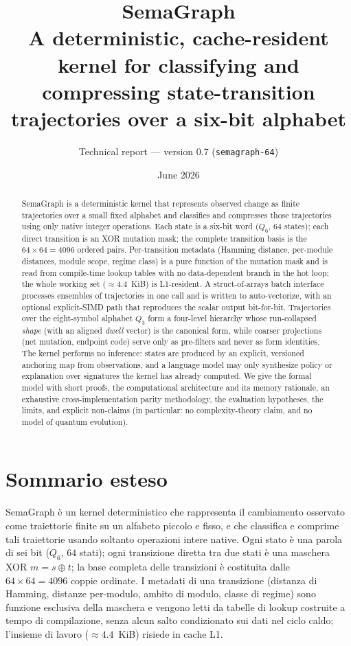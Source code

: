 \documentclass[11pt,a4paper]{article}
\title{SemaGraph\\[2pt]
\large A deterministic, cache-resident kernel for classifying and compressing
state-transition trajectories over a six-bit alphabet}
\author{Technical report --- version 0.7 (\texttt{semagraph-64})}
\date{June 2026}
\begin{document}
\maketitle

\begin{abstract}
SemaGraph is a deterministic kernel that represents observed change as finite
trajectories over a small fixed alphabet and classifies and compresses those
trajectories using only native integer operations. Each state is a six-bit word
($Q_6$, $64$ states); each direct transition is an XOR mutation mask; the complete
transition basis is the $64\times64=4096$ ordered pairs. Per-transition metadata
(Hamming distance, per-module distances, module scope, regime class) is a pure
function of the mutation mask and is read from compile-time lookup tables with no
data-dependent branch in the hot loop; the whole working set ($\approx 4.4$~KiB)
is L1-resident. A struct-of-arrays batch interface processes ensembles of
trajectories in one call and is written to auto-vectorize, with an optional
explicit-SIMD path that reproduces the scalar output bit-for-bit. Trajectories
over the eight-symbol alphabet $Q_3$ form a four-level hierarchy whose
run-collapsed \emph{shape} (with an aligned \emph{dwell} vector) is the canonical
form, while coarser projections (net mutation, endpoint code) serve only as
pre-filters and never as form identities. The kernel performs no inference: states
are produced by an explicit, versioned anchoring map from observations, and a
language model may only synthesize policy or explanation over signatures the
kernel has already computed. We give the formal model with short proofs, the
computational architecture and its memory rationale, an exhaustive
cross-implementation parity methodology, the evaluation hypotheses, the limits,
and explicit non-claims (in particular: no complexity-theory claim, and no model
of quantum evolution).
\end{abstract}

\section*{Sommario esteso}
SemaGraph è un kernel deterministico che rappresenta il cambiamento osservato come
traiettorie finite su un alfabeto piccolo e fisso, e che classifica e comprime
tali traiettorie usando soltanto operazioni intere native. Ogni stato è una parola
di sei bit ($Q_6$, $64$ stati); ogni transizione diretta tra due stati è una
maschera XOR $m = s \oplus t$; la base completa delle transizioni è costituita
dalle $64 \times 64 = 4096$ coppie ordinate. I metadati di una transizione
(distanza di Hamming, distanze per-modulo, ambito di modulo, classe di regime)
sono funzione esclusiva della maschera e vengono letti da tabelle di lookup
costruite a tempo di compilazione, senza alcun salto condizionato sui dati nel
ciclo caldo; l'insieme di lavoro ($\approx 4.4$~KiB) risiede in cache L1.
\end{document}
